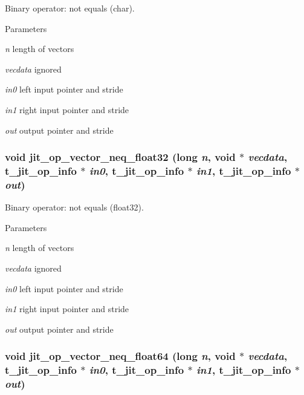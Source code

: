 Binary operator: not equals (char). 
\begin{DoxyParams}{Parameters}
\item[{\em n}]length of vectors \item[{\em vecdata}]ignored \item[{\em in0}]left input pointer and stride \item[{\em in1}]right input pointer and stride \item[{\em out}]output pointer and stride \end{DoxyParams}
\hypertarget{group__opvecmod_ga26c4d87db1be85cc1823e00c3a7dd14f}{
\subsubsection[{jit\_\-op\_\-vector\_\-neq\_\-float32}]{\setlength{\rightskip}{0pt plus 5cm}void jit\_\-op\_\-vector\_\-neq\_\-float32 (long {\em n}, \/  void $\ast$ {\em vecdata}, \/  {\bf t\_\-jit\_\-op\_\-info} $\ast$ {\em in0}, \/  {\bf t\_\-jit\_\-op\_\-info} $\ast$ {\em in1}, \/  {\bf t\_\-jit\_\-op\_\-info} $\ast$ {\em out})}}
\label{group__opvecmod_ga26c4d87db1be85cc1823e00c3a7dd14f}


Binary operator: not equals (float32). 
\begin{DoxyParams}{Parameters}
\item[{\em n}]length of vectors \item[{\em vecdata}]ignored \item[{\em in0}]left input pointer and stride \item[{\em in1}]right input pointer and stride \item[{\em out}]output pointer and stride \end{DoxyParams}
\hypertarget{group__opvecmod_ga2865fb03ed572a6cf1034f150217784d}{
\subsubsection[{jit\_\-op\_\-vector\_\-neq\_\-float64}]{\setlength{\rightskip}{0pt plus 5cm}void jit\_\-op\_\-vector\_\-neq\_\-float64 (long {\em n}, \/  void $\ast$ {\em vecdata}, \/  {\bf t\_\-jit\_\-op\_\-info} $\ast$ {\em in0}, \/  {\bf t\_\-jit\_\-op\_\-info} $\ast$ {\em in1}, \/  {\bf t\_\-jit\_\-op\_\-info} $\ast$ {\em out})}}
\label{group__opvecmod_ga2865fb03ed572a6cf1034f150217784d}


